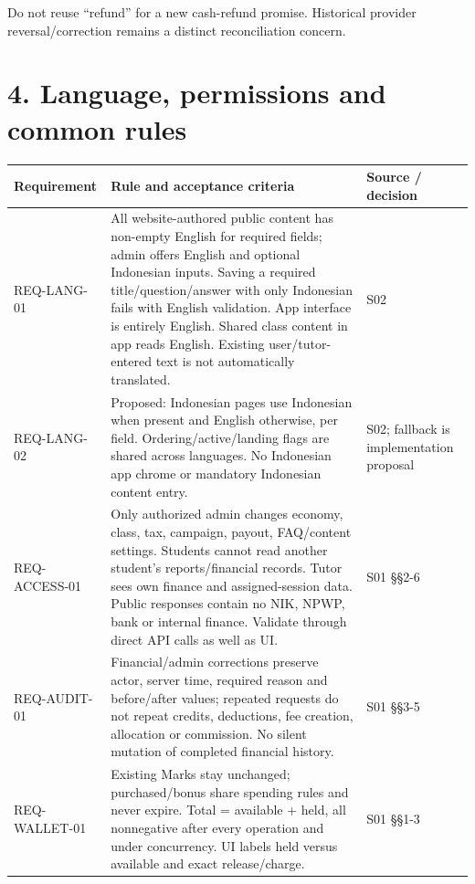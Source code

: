 \documentclass[11pt,a4paper]{article}
\newcounter{none}
\begin{document}
Do not reuse ``refund'' for a new cash-refund promise. Historical provider reversal/correction remains a distinct reconciliation concern.

\section{4. Language, permissions and common rules}\label{language-permissions-and-common-rules}

{\def\LTcaptype{none} %
\begin{longtable}[]{@{}
  >{\raggedright\arraybackslash}p{}
  >{\raggedright\arraybackslash}p{}
  >{\raggedright\arraybackslash}p{}@{}}
\toprule\noalign{}
\begin{minipage}[b]{\linewidth}\raggedright
Requirement
\end{minipage} & \begin{minipage}[b]{\linewidth}\raggedright
Rule and acceptance criteria
\end{minipage} & \begin{minipage}[b]{\linewidth}\raggedright
Source / decision
\end{minipage} \\
\midrule\noalign{}
\endhead
\bottomrule\noalign{}
\endlastfoot
REQ-LANG-01 & All website-authored public content has non-empty English for required fields; admin offers English and optional Indonesian inputs. Saving a required title/question/answer with only Indonesian fails with English validation. App interface is entirely English. Shared class content in app reads English. Existing user/tutor-entered text is not automatically translated. & S02 \\
REQ-LANG-02 & Proposed: Indonesian pages use Indonesian when present and English otherwise, per field. Ordering/active/landing flags are shared across languages. No Indonesian app chrome or mandatory Indonesian content entry. & S02; fallback is implementation proposal \\
REQ-ACCESS-01 & Only authorized admin changes economy, class, tax, campaign, payout, FAQ/content settings. Students cannot read another student's reports/financial records. Tutor sees own finance and assigned-session data. Public responses contain no NIK, NPWP, bank or internal finance. Validate through direct API calls as well as UI. & S01 §§2-6 \\
REQ-AUDIT-01 & Financial/admin corrections preserve actor, server time, required reason and before/after values; repeated requests do not repeat credits, deductions, fee creation, allocation or commission. No silent mutation of completed financial history. & S01 §§3-5 \\
REQ-WALLET-01 & Existing Marks stay unchanged; purchased/bonus share spending rules and never expire. Total = available + held, all nonnegative after every operation and under concurrency. UI labels held versus available and exact release/charge. & S01 §§1-3 \\
\end{longtable}
}
\end{document}
